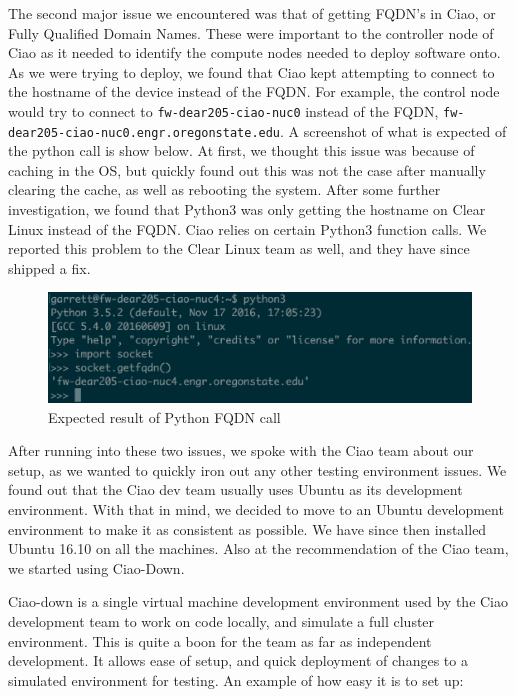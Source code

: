 \documentclass[10pt,onecolumn,journal,draftclsnofoot]{IEEEtran}
\begin{document}
The second major issue we encountered was that of getting FQDN's in Ciao, or
Fully Qualified Domain Names. These were important to the controller node of
Ciao as it needed to identify the compute nodes needed to deploy software onto.
As we were trying to deploy, we found that Ciao kept attempting to connect to
the hostname of the device instead of the FQDN. For example, the control node
would try to connect to \texttt{fw-dear205-ciao-nuc0} instead of the FQDN,
\texttt{fw-dear205-ciao-nuc0.engr.oregonstate.edu}. A screenshot of what is
expected of the python call is show below. At first, we thought this issue was
because of caching in the OS, but quickly found out this was not the case after
manually clearing the cache, as well as rebooting the system.  After some
further investigation, we found that Python3 was only getting the hostname on
Clear Linux instead of the FQDN. Ciao relies on certain Python3 function calls.
We reported this problem to the Clear Linux team as well, and they have since
shipped a fix. 

\begin{figure}[h]
	\caption{Expected result of Python FQDN call}
	\centering
	\includegraphics[scale=0.5]{getfqdn.eps}
\end{figure}

After running into these two issues, we spoke with the Ciao team about our
setup, as we wanted to quickly iron out any other testing environment issues.
We found out that the Ciao dev team usually uses Ubuntu as its development
environment. With that in mind, we decided to move to an Ubuntu development
environment to make it as consistent as possible. We have since then installed
Ubuntu 16.10 on all the machines. Also at the recommendation of the Ciao team,
we started using Ciao-Down.

Ciao-down is a single virtual machine development
environment used by the Ciao development team to work on code locally, and 
simulate a full cluster environment. This is quite a boon for the team as far
as independent development. It allows ease of setup, and quick deployment of
changes to a simulated environment for testing. An example of how easy it is
to set up:\cite{ciao-down}
\end{document}
